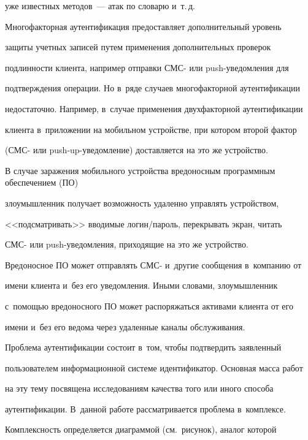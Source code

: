 уже известных методов~--- атак по словарю и~т.\,д.


  


  Многофакторная аутентификация предоставляет дополнительный уровень 


защиты учетных записей путем применения дополнительных проверок 


подлинности клиента, например отправки СМС- или push-уве\-дом\-ле\-ния для 


под\-тверж\-де\-ния операции. Но в~ряде случаев многофакторной аутентификации 


недостаточно. Например, в~случае применения двухфакторной аутентификации 


клиента в~приложении на мобильном устройстве, при котором второй фактор 


(СМС- или push-up-уве\-дом\-ле\-ние) доставляется на это же устройство.


  


  В случае заражения мобильного устройства вредоносным программным обеспечением (ПО) 


злоумышленник получает возможность удаленно управлять устройством, 


<<подсматривать>> вводимые логин/пароль, перекрывать экран, читать  


СМС- или push-уве\-дом\-ле\-ния, приходящие на это же устройство. 


Вредоносное ПО может отправлять СМС- и~другие сообщения в~компанию от 


имени клиента и~без его уведомления. Иными словами, злоумышленник 


с~помощью вредоносного ПО может распоряжаться активами клиента от его 


имени и~без его ведома через удаленные каналы обслуживания.


  


  Проблема аутентификации состоит в~том, чтобы подтвердить заявленный 


пользователем информационной системе идентификатор. Основная масса работ 


на эту тему посвящена исследованиям качества того или иного способа 


аутентификации. В~данной работе рассматривается проблема в~комплексе. 


Комплексность определяется диаграммой (см.\ рисунок), аналог которой 


